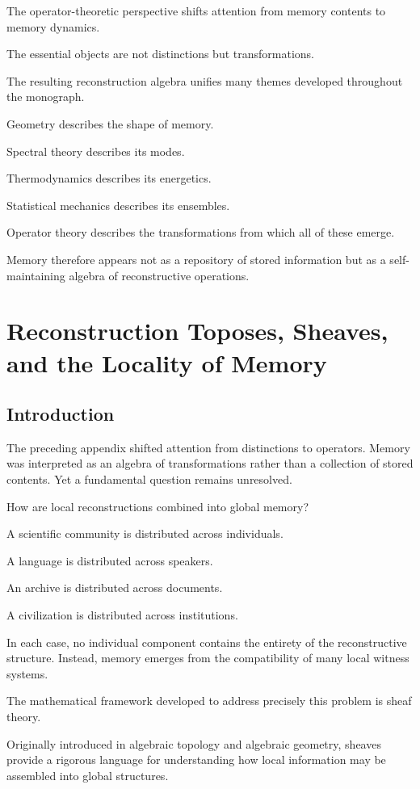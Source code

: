 \documentclass[12pt,oneside]{book}
\theoremstyle{plain} \newtheorem{theorem}{Theorem}[chapter] \newtheorem{lemma}[theorem]{Lemma} \newtheorem{proposition}[theorem]{Proposition} \newtheorem{corollary}[theorem]{Corollary}
\theoremstyle{definition} \newtheorem{definition}[theorem]{Definition} \newtheorem{axiom}[theorem]{Axiom} \newtheorem{construction}[theorem]{Construction}
\theoremstyle{remark} \newtheorem{remark}[theorem]{Remark} \newtheorem{example}[theorem]{Example}
\begin{document}
The operator-theoretic perspective shifts attention from memory contents to memory dynamics.

The essential objects are not distinctions but transformations.

The resulting reconstruction algebra unifies many themes developed throughout the monograph.

Geometry describes the shape of memory.

Spectral theory describes its modes.

Thermodynamics describes its energetics.

Statistical mechanics describes its ensembles.

Operator theory describes the transformations from which all of these emerge.

Memory therefore appears not as a repository of stored information but as a self-maintaining algebra of reconstructive operations.

\chapter{Reconstruction Toposes, Sheaves, and the Locality of Memory}

\section{Introduction}

The preceding appendix shifted attention from distinctions to operators. Memory was interpreted as an algebra of transformations rather than a collection of stored contents. Yet a fundamental question remains unresolved.

How are local reconstructions combined into global memory?

A scientific community is distributed across individuals.

A language is distributed across speakers.

An archive is distributed across documents.

A civilization is distributed across institutions.

In each case, no individual component contains the entirety of the reconstructive structure. Instead, memory emerges from the compatibility of many local witness systems.

The mathematical framework developed to address precisely this problem is sheaf theory.

Originally introduced in algebraic topology and algebraic geometry, sheaves provide a rigorous language for understanding how local information may be assembled into global structures.
\end{document}
